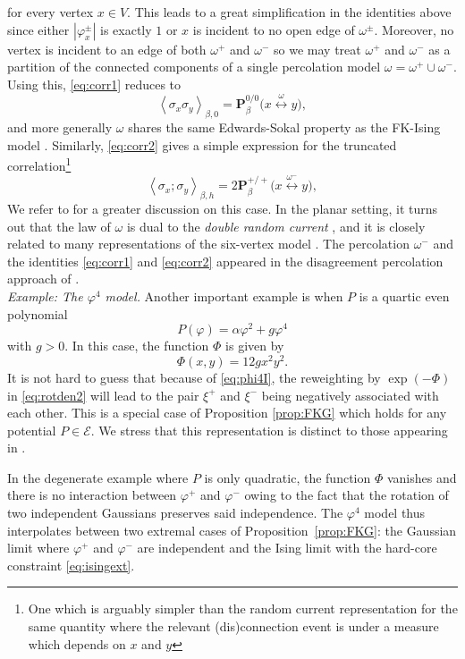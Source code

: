 \documentclass{article}
\numberwithin{equation}{section}
\theoremstyle{definition}
\theoremstyle{definition}
\theoremstyle{remark}
\newcommand\vp{\varphi}
\newcommand\Ec{\mathcal{E}}
\newcommand{\w}{\omega}
\newcommand{\vpp}{\vp^+}
\newcommand{\vpm}{\vp^-}
\newcommand{\I}{\Phi}
\renewcommand{\P}{\mathrm{\mathbf{P}}}
\newcommand{\Lp}{\xi^+}
\newcommand{\Lm}{\xi^-}
\begin{document}
for every vertex $x \in V$. This leads to a great simplification in the identities above since either $|\vp_x^\pm|$ is exactly $1$ or $x$ is incident to no open edge of $\w^\pm$. Moreover, no vertex is incident to an edge of both $\w^+$ and $\w^-$ so we may treat $\w^+$ and $\w^-$ as a partition of the connected components of a single percolation model $\w = \w^+ \cup \w^-$. Using this, \eqref{eq:corr1} reduces to
\[
	\left< \sigma_x \sigma_y \right>_{\beta,0} = \P^{0 / 0}_\beta\big(x \overset{\w}{\longleftrightarrow} y\big), 
\] 
and more generally $\w$ shares the same Edwards-Sokal property as the FK-Ising model \cite[Theorem 2.7]{AHL}. Similarly, \eqref{eq:corr2} gives a simple expression for the truncated correlation{\hypersetup{linkcolor=black}\footnote{One which is arguably simpler than the random current representation for the same quantity where the relevant (dis)connection event is under a measure which depends on $x$ and $y$}} 
\begin{equation}\label{eq:isingtrunc}
	\left< \sigma_x; \sigma_y \right>_{\beta,h} = 2\P^{+ / +}_\beta\big(  x \overset{\w^-}{\longleftrightarrow} y \big),
\end{equation}
We refer to \cite{AHL} for a greater discussion on this case.
In the planar setting, it turns out that the law of $\w$ is dual to the \emph{double random current} \cite[Proposition 2.8]{AHL}, 
and it is closely related to many representations of the six-vertex model \cite{GlaPel,Lis22b,glazman2025delocalisation}. 
The percolation $\w^-$ and the identities \eqref{eq:corr1} and \eqref{eq:corr2} appeared in the disagreement percolation approach of \cite{aizenman2020exponential}.
\\[1em]
\noindent\emph{Example: The $\vp^4$ model.} Another important example is when $P$ is a quartic even polynomial
\[
P(\vp) = \alpha \vp^2 + g \vp^4
\] 
with $g > 0$. In this case, the function $\I$ is given by 
\begin{equation}\label{eq:phi4I}
\I(x,y) = 12g x^2y^2.
\end{equation} 
It is not hard to guess that because of \eqref{eq:phi4I}, the reweighting by $\exp(-\I)$ in \eqref{eq:rotden2} will lead to the pair $\Lp$ and $\Lm$ being negatively associated with each other. This is a special case of Proposition \ref{prop:FKG} which holds for any potential $P \in \Ec$. We stress that this representation is distinct to those appearing in \cite{GPPS,GPPS2}.

In the degenerate example where $P$ is only quadratic, the function $\I$ vanishes and there is no interaction between $\vpp$ and $\vpm$ owing to the fact that the rotation of two independent Gaussians preserves said independence. The $\vp^4$ model thus interpolates between two extremal cases of Proposition~\ref{prop:FKG}: the Gaussian limit where $\vp^+$ and $\vp^-$ are independent and the Ising limit with the hard-core constraint \eqref{eq:isingext}.
\end{document}
